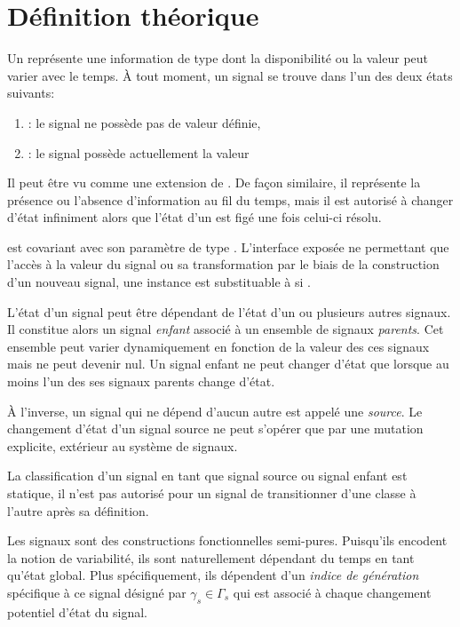 \section{Définition théorique}
	
	Un  représente une information de type  dont la disponibilité ou la valeur peut varier avec le temps.
	À tout moment, un signal se trouve dans l'un des deux états suivants:
	\begin{enumerate}
		\item {}: le signal ne possède pas de valeur définie,
		\item {}: le signal possède actuellement la valeur 
	\end{enumerate}

	Il peut être vu comme une extension de . De façon similaire, il représente la présence ou l'absence d'information au fil du temps, mais il est autorisé à changer d'état infiniment alors que l'état d'un  est figé une fois celui-ci résolu.
	
	 est covariant avec son paramètre de type . L'interface exposée ne permettant que l'accès à la valeur du signal ou sa transformation par le biais de la construction d'un nouveau signal, une instance  est substituable à  si .
	
	L'état d'un signal peut être dépendant de l'état d'un ou plusieurs autres signaux. Il constitue alors un signal \emph{enfant} associé à un ensemble de signaux \emph{parents}. Cet ensemble peut varier dynamiquement en fonction de la valeur des ces signaux mais ne peut devenir nul. Un signal enfant ne peut changer d'état que lorsque au moins l'un des ses signaux parents change d'état.
	
	À l'inverse, un signal qui ne dépend d'aucun autre est appelé une \emph{source}. Le changement d'état d'un signal source ne peut s'opérer que par une mutation explicite, extérieur au système de signaux.
	
	La classification d'un signal en tant que signal source ou signal enfant est statique, il n'est pas autorisé pour un signal de transitionner d'une classe à l'autre après sa définition.
	
	Les signaux sont des constructions fonctionnelles semi-pures. Puisqu'ils encodent la notion de variabilité, ils sont naturellement dépendant du temps en tant qu'état global. Plus spécifiquement, ils dépendent d'un \emph{indice de génération} spécifique à ce signal désigné par $\gamma_s \in \Gamma_s$ qui est associé à chaque changement potentiel d'état du signal.
	
